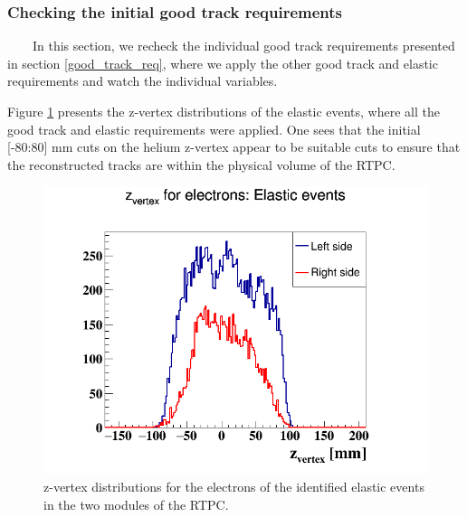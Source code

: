 \subsubsection{Checking the initial good track requirements}
~~~~In this section, we recheck the individual good track requirements 
presented in section \ref{good_track_req}, where we apply the other good track 
and elastic requirements and watch the individual variables.

Figure \ref{fig:2-z-vertex} presents the z-vertex distributions of the elastic 
events, where all the good track and elastic requirements were applied. One 
sees that the initial [-80:80] mm cuts on the helium z-vertex appear to be 
suitable cuts to ensure that the reconstructed tracks are within the physical 
volume of the RTPC.
\begin{figure}[tp]
  \centering
   \includegraphics[scale=0.34]{fig_rtpc/updates/elastic_z_vertex.png}
\caption{z-vertex distributions for the electrons of the identified elastic 
events in the two modules of the RTPC.}
\label{fig:2-z-vertex}
\end{figure} 

